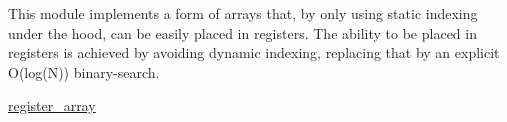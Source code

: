 This module implements a form of arrays that, by only using static indexing under the hood, can be easily placed in registers. The ability to be placed in registers is achieved by avoiding dynamic indexing, replacing that by an explicit O(log(\+N)) binary-\/search.


\begin{DoxyItemize}
\item \hyperlink{structcugar_1_1register__array}{register\+\_\+array} 
\end{DoxyItemize}